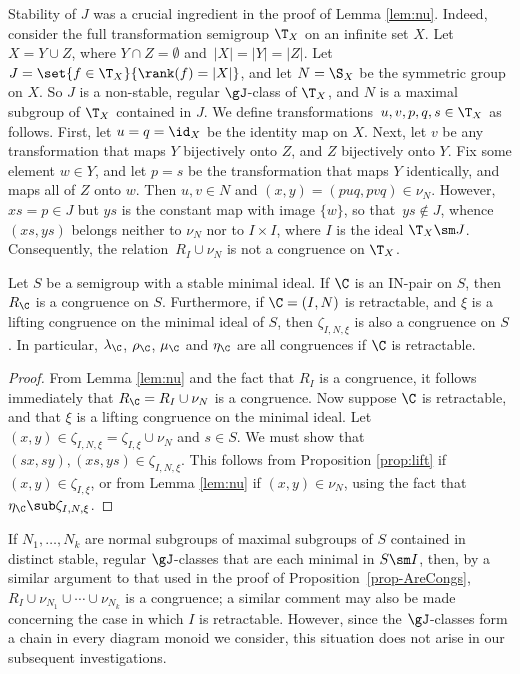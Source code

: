 \begin{rem}\label{rem:TX}
Stability of $J$ was a crucial ingredient in the proof of Lemma \ref{lem:nu}.  Indeed, consider the full transformation semigroup $\T_X$ on an infinite set $X$.  Let $X=Y\cup Z$, where $Y\cap Z=\emptyset$ and~${|X|=|Y|=|Z|}$.  Let~$J=\set{f\in\T_X}{\rank(f)=|X|}$, and let $N=\S_X$ be the symmetric group on $X$.  So $J$ is a non-stable, regular $\gJ$-class of $\T_X$, and $N$ is a maximal subgroup of $\T_X$ contained in $J$.  We define transformations~$u,v,p,q,s\in\T_X$ as follows.  First, let $u=q=\id_X$ be the identity map on $X$.  Next, let $v$ be any transformation that maps $Y$ bijectively onto $Z$, and $Z$ bijectively onto $Y$.  Fix some element $w\in Y$, and let $p=s$ be the transformation that maps $Y$ identically, and maps all of $Z$ onto $w$.  Then $u,v\in N$ and $(x,y)=(puq,pvq)\in\nu_N$.  However, $xs=p\in J$ but $ys$ is the constant map with image $\{w\}$, so that~$ys\not\in J$, whence $(xs,ys)$ belongs neither to $\nu_N$ nor to $I\times I$, where $I$ is the ideal $\T_X\sm J$.  Consequently, the relation~$R_I\cup\nu_N$ is not a congruence on $\T_X$.
\end{rem}

\begin{proposition}
\label{prop-AreCongs}
Let $S$ be a semigroup with a stable minimal ideal.  If $\C$ is an IN-pair on $S$, then $R_\C$ is a congruence on $S$.  Furthermore, if $\C=(I,N)$ is retractable, and $\xi$ is a lifting congruence on the minimal ideal of $S$, then $\zeta_{I,N,\xi}$ is also a congruence on $S$.  In particular, $\lambda_\C$, $\rho_\C$, $\mu_\C$ and $\eta_\C$ are all congruences if $\C$ is retractable.
\end{proposition}

\begin{proof}
From Lemma \ref{lem:nu} and the fact that $R_I$ is a congruence, it follows immediately that $R_\C=R_I\cup\nu_N$ is a congruence.  Now suppose $\C$ is retractable, and that $\xi$ is a lifting congruence on the minimal ideal.  Let $(x,y)\in\zeta_{I,N,\xi}=\zeta_{I,\xi}\cup\nu_N$ and $s\in S$.  We must show that $(sx,sy),(xs,ys)\in\zeta_{I,N,\xi}$.  This follows from Proposition \ref{prop:lift} if $(x,y)\in\zeta_{I,\xi}$, or from Lemma \ref{lem:nu} if $(x,y)\in\nu_N$, using the fact that~$\eta_\C\sub\zeta_{I,N,\xi}$.  \end{proof}



\begin{rem}
If $N_1,\ldots,N_k$ are normal subgroups of maximal subgroups of $S$ contained in distinct stable, regular $\gJ$-classes that are each minimal in $S\sm I$, then, by a similar argument to that used in the proof of Proposition~\ref{prop-AreCongs}, $R_I\cup\nu_{N_1}\cup\cdots\cup\nu_{N_k}$ is a congruence; a similar comment may also be made concerning the case in which $I$ is retractable.  However, since the $\gJ$-classes form a chain in every diagram monoid we consider, this situation does not arise in our subsequent investigations.
\end{rem}

